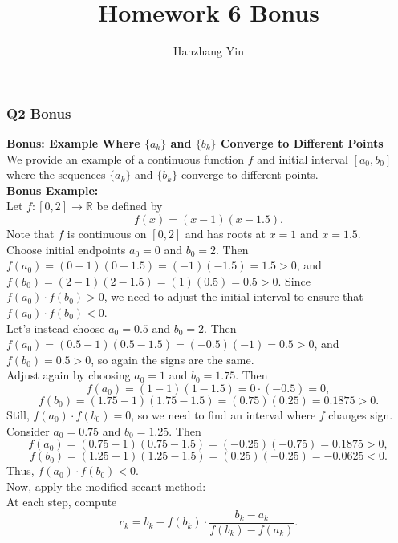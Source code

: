\documentclass{article}
\title{\vspace{-4em}Homework 6 Bonus}
\author{Hanzhang Yin}
\begin{document}
\maketitle

\subsubsection*{Q2 Bonus}

\textbf{Bonus: Example Where \( \{ a_k \} \) and \( \{ b_k \} \) Converge to Different Points}
    \\
    We provide an example of a continuous function \( f \) and initial interval \( [a_0, b_0] \) where the sequences \( \{ a_k \} \) and \( \{ b_k \} \) converge to different points.
    \\
    \textbf{Bonus Example:}
    \\
    Let \( f: [0, 2] \to \mathbb{R} \) be defined by
    \[
        f(x) = (x - 1)(x - 1.5).
    \]
    Note that \( f \) is continuous on \( [0, 2] \) and has roots at \( x = 1 \) and \( x = 1.5 \).
    \\
    Choose initial endpoints \( a_0 = 0 \) and \( b_0 = 2 \). Then \( f(a_0) = (0 - 1)(0 - 1.5) = ( -1)( -1.5) = 1.5 > 0 \), and \( f(b_0) = (2 - 1)(2 - 1.5) = (1)(0.5) = 0.5 > 0 \). Since \( f(a_0) \cdot f(b_0) > 0 \), we need to adjust the initial interval to ensure that \( f(a_0) \cdot f(b_0) < 0 \).
    \\
    Let's instead choose \( a_0 = 0.5 \) and \( b_0 = 2 \). Then \( f(a_0) = (0.5 - 1)(0.5 - 1.5) = ( -0.5)( -1) = 0.5 > 0 \), and \( f(b_0) = 0.5 > 0 \), so again the signs are the same.
    \\
    Adjust again by choosing \( a_0 = 1 \) and \( b_0 = 1.75 \). Then
    \[
        f(a_0) = (1 - 1)(1 - 1.5) = 0 \cdot ( -0.5) = 0,
    \]
    \[
        f(b_0) = (1.75 - 1)(1.75 - 1.5) = (0.75)(0.25) = 0.1875 > 0.
    \]
    Still, \( f(a_0) \cdot f(b_0) = 0 \), so we need to find an interval where \( f \) changes sign.
    \\
    Consider \( a_0 = 0.75 \) and \( b_0 = 1.25 \). Then
    \[
        f(a_0) = (0.75 - 1)(0.75 - 1.5) = ( -0.25)( -0.75) = 0.1875 > 0,
    \]
    \[
        f(b_0) = (1.25 - 1)(1.25 - 1.5) = (0.25)( -0.25) = -0.0625 < 0.
    \]
    Thus, \( f(a_0) \cdot f(b_0) < 0 \).
    \\
    Now, apply the modified secant method:
    \\
    At each step, compute
    \[
      c_k = b_k - f(b_k) \cdot \frac{b_k - a_k}{f(b_k) - f(a_k)}.
    \]
\end{document}
